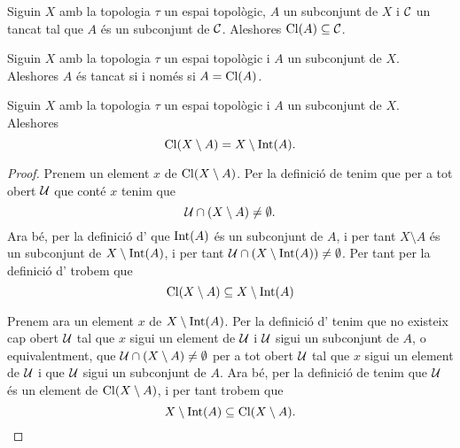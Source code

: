 \documentclass[../../Main.tex]{subfiles}
\begin{document}
	\begin{corollary}
		\label{cor:la clausura d'un conjunt és el tancat més petit que el conté}
		Siguin \(X\) amb la topologia \(\tau\) un espai topològic, \(A\) un subconjunt de \(X\) i \(\mathcal{C}\) un tancat tal que \(A\) és un subconjunt de \(\mathcal{C}\). Aleshores \(\operatorname{Cl}(A)\subseteq\mathcal{C}\).
	\end{corollary}
	\begin{corollary}
		\label{cor:un conjunt és tancat si i només si és igual a la seva clausura}
		Siguin \(X\) amb la topologia \(\tau\) un espai topològic i \(A\) un subconjunt de \(X\). Aleshores \(A\) és tancat si i només si \(A=\operatorname{Cl}(A)\).
	\end{corollary}
	\begin{proposition}
		\label{prop:la clausura d'un conjunt és el complementari de l'interior del complementari del conjunt}
		Siguin \(X\) amb la topologia \(\tau\) un espai topològic i \(A\) un subconjunt de \(X\). Aleshores
		\[
		    \operatorname{Cl}(X\setminus A)=X\setminus\operatorname{Int}(A).
		\]
		\begin{proof} %
			Prenem un element \(x\) de \(\operatorname{Cl}(X\setminus A)\). Per la definició de  tenim que per a tot obert \(\mathcal{U}\) que conté \(x\) tenim que
			\[
			    \mathcal{U}\cap(X\setminus A)\neq\emptyset.
			\]
			Ara bé, per la definició d' que \(\operatorname{Int}(A)\) és un subconjunt de \(A\), i per tant \(X\setminus A\) és un subconjunt de \(X\setminus\operatorname{Int}(A)\), i per tant \(\mathcal{U}\cap(X\setminus\operatorname{Int}(A))\neq\emptyset\). Per tant per la definició d' trobem que
			\begin{equation}
				\label{prop:la clausura d'un conjunt és el complementari de l'interior del complementari del conjunt:eq1}
				\operatorname{Cl}(X\setminus A)\subseteq X\setminus\operatorname{Int}(A)
			\end{equation}
			
			Prenem ara un element \(x\) de \(X\setminus\operatorname{Int}(A)\). Per la definició d' tenim que no existeix cap obert \(\mathcal{U}\) tal que \(x\) sigui un element de \(\mathcal{U}\) i \(\mathcal{U}\) sigui un subconjunt de \(A\), o equivalentment, que \(\mathcal{U}\cap(X\setminus A)\neq\emptyset\) per a tot obert \(\mathcal{U}\) tal que \(x\) sigui un element de  \(\mathcal{U}\) i que \(\mathcal{U}\) sigui un subconjunt de \(A\). Ara bé, per la definició de  tenim que \(\mathcal{U}\) és un element de \(\operatorname{Cl}(X\setminus A)\), i per tant trobem que
			\begin{equation}
				\label{prop:la clausura d'un conjunt és el complementari de l'interior del complementari del conjunt:eq2}
				X\setminus\operatorname{Int}(A)\subseteq\operatorname{Cl}(X\setminus A).
			\end{equation}
			

\end{proof}
\end{proposition}
\end{document}
